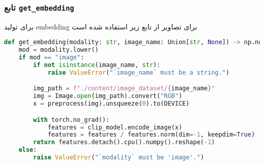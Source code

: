 \documentclass{article}
\begin{document}
\subsubsection*{تابع \texttt{get\_embedding}}

برای تولید embedding برای تصاویر از تابع زیر استفاده شده است

\begin{latin}
\begin{lstlisting}[language=python]
def get_embedding(modality: str, image_name: Union[str, None]) -> np.ndarray:
    mod = modality.lower()
    if mod == "image":
        if not isinstance(image_name, str):
            raise ValueError("`image_name` must be a string.")

        img_path = f"./content/image_dataset/{image_name}"
        img = Image.open(img_path).convert("RGB")
        x = preprocess(img).unsqueeze(0).to(DEVICE)

        with torch.no_grad():
            features = clip_model.encode_image(x)
            features = features / features.norm(dim=-1, keepdim=True)
        return features.detach().cpu().numpy().reshape(-1)
    else:
        raise ValueError("`modality` must be 'image'.")
\end{lstlisting}
\end{latin}
\end{document}
